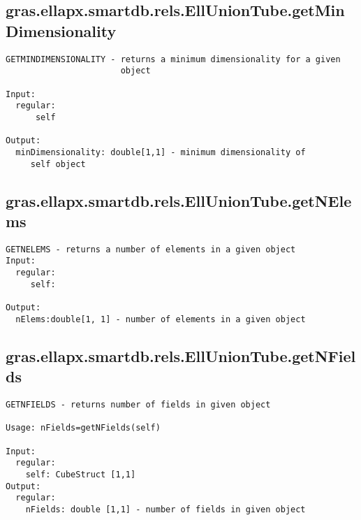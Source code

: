\subsection{\texorpdfstring{gras.ellapx.smartdb.rels.EllUnionTube.getMinDimensionality}{getMinDimensionality}}\label{method:gras.ellapx.smartdb.rels.EllUnionTube.getMinDimensionality}
\begin{verbatim}
GETMINDIMENSIONALITY - returns a minimum dimensionality for a given
                       object

Input:
  regular:
      self

Output:
  minDimensionality: double[1,1] - minimum dimensionality of
     self object
\end{verbatim}
\subsection{\texorpdfstring{gras.ellapx.smartdb.rels.EllUnionTube.getNElems}{getNElems}}\label{method:gras.ellapx.smartdb.rels.EllUnionTube.getNElems}
\begin{verbatim}
GETNELEMS - returns a number of elements in a given object
Input:
  regular:
     self:

Output:
  nElems:double[1, 1] - number of elements in a given object
\end{verbatim}
\subsection{\texorpdfstring{gras.ellapx.smartdb.rels.EllUnionTube.getNFields}{getNFields}}\label{method:gras.ellapx.smartdb.rels.EllUnionTube.getNFields}
\begin{verbatim}
GETNFIELDS - returns number of fields in given object

Usage: nFields=getNFields(self)

Input:
  regular:
    self: CubeStruct [1,1]
Output:
  regular:
    nFields: double [1,1] - number of fields in given object
\end{verbatim}
